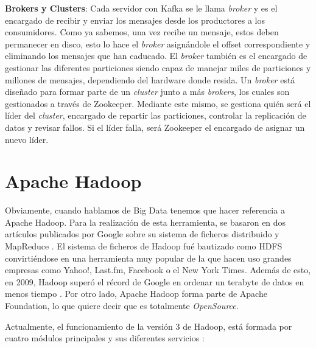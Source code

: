 \textbf{Brokers y Clusters}: Cada servidor con Kafka se le llama {\em
  broker} y es el encargado de recibir y enviar los mensajes desde los
productores a los consumidores. Como ya sabemos, una vez recibe un mensaje,
estos deben permanecer en disco, esto lo hace el \emph{broker} asignándole el
offset correspondiente y eliminando los mensajes que han caducado. El
\emph{broker} también es el encargado de gestionar las diferentes particiones
siendo capaz de manejar miles de particiones y millones de mensajes,
dependiendo del hardware donde resida. Un \emph{broker} está diseñado para formar
parte de un \emph{cluster} junto a más \emph{brokers}, los cuales son gestionados a
través de Zookeeper. Mediante este mismo, se gestiona quién será el líder
del \emph{cluster}, encargado de repartir las particiones, controlar la
replicación de datos y revisar fallos. Si el líder falla, será Zookeeper el
encargado de asignar un nuevo líder.


\section{Apache Hadoop\label{Hadoop}}

Obviamente, cuando hablamos de Big Data tenemos que hacer referencia a
Apache Hadoop. Para la realización de esta herramienta, se basaron en dos
artículos publicados por Google sobre su sistema de ficheros distribuido
\cite{Hdp-2} y MapReduce \cite{Hdp-3}. El sistema de ficheros de Hadoop fué
bautizado como HDFS convirtiéndose en una herramienta muy popular de la que
hacen uso grandes empresas como Yahoo!, Last.fm, Facebook o el New York
Times. Además de esto, en 2009, Hadoop superó el récord de Google en
ordenar un terabyte de datos en menos tiempo \cite{Hdp-1}. Por otro lado,
Apache Hadoop forma parte de Apache Foundation, lo que quiere decir que es
totalmente \emph{OpenSource}.

Actualmente, el funcionamiento de la versión 3 de Hadoop, está formada por
cuatro módulos principales y sus diferentes servicios \cite{Hdp-4}:

